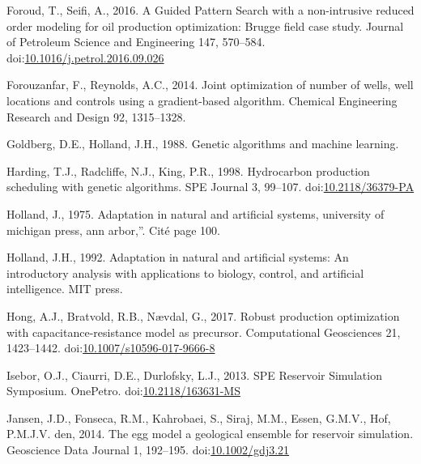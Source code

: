 \documentclass[]{elsarticle} %
\newlength{\cslhangindent}
\newenvironment{CSLReferences}[2] %
 {%
  \setlength{\parindent}{0pt}
  \ifodd #1 \everypar{\setlength{\hangindent}{\cslhangindent}}\ignorespaces\fi
  \ifnum #2 > 0
  \setlength{\parskip}{#2\baselineskip}
  \fi
 }%
 {}
\begin{document}
\begin{eqution}
\begin{CSLReferences}{1}{0}
\leavevmode{}%
Foroud, T., Seifi, A., 2016. A Guided Pattern Search with a non-intrusive reduced order modeling for oil production optimization: Brugge field case study. Journal of Petroleum Science and Engineering 147, 570--584. doi:\href{https://doi.org/10.1016/j.petrol.2016.09.026}{10.1016/j.petrol.2016.09.026}

\leavevmode{}%
Forouzanfar, F., Reynolds, A.C., 2014. Joint optimization of number of wells, well locations and controls using a gradient-based algorithm. Chemical Engineering Research and Design 92, 1315--1328.

\leavevmode{}%
Goldberg, D.E., Holland, J.H., 1988. Genetic algorithms and machine learning.

\leavevmode{}%
Harding, T.J., Radcliffe, N.J., King, P.R., 1998. Hydrocarbon production scheduling with genetic algorithms. SPE Journal 3, 99--107. doi:\href{https://doi.org/10.2118/36379-PA}{10.2118/36379-PA}

\leavevmode{}%
Holland, J., 1975. Adaptation in natural and artificial systems, university of michigan press, ann arbor,{''}. Cité page 100.

\leavevmode{}%
Holland, J.H., 1992. Adaptation in natural and artificial systems: An introductory analysis with applications to biology, control, and artificial intelligence. MIT press.

\leavevmode{}%
Hong, A.J., Bratvold, R.B., Nævdal, G., 2017. Robust production optimization with capacitance-resistance model as precursor. Computational Geosciences 21, 1423--1442. doi:\href{https://doi.org/10.1007/s10596-017-9666-8}{10.1007/s10596-017-9666-8}

\leavevmode{}%
Isebor, O.J., Ciaurri, D.E., Durlofsky, L.J., 2013. SPE Reservoir Simulation Symposium. OnePetro. doi:\href{https://doi.org/10.2118/163631-MS}{10.2118/163631-MS}

\leavevmode{}%
Jansen, J.D., Fonseca, R.M., Kahrobaei, S., Siraj, M.M., Essen, G.M.V., Hof, P.M.J.V. den, 2014. The egg model {\textendash} a geological ensemble for reservoir simulation. Geoscience Data Journal 1, 192--195. doi:\href{https://doi.org/10.1002/gdj3.21}{10.1002/gdj3.21}


\end{CSLReferences}
\end{eqution}
\end{document}
